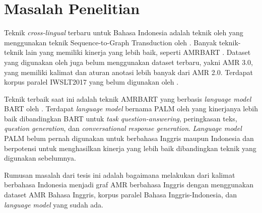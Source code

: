 \section{Masalah Penelitian}

Teknik \textit{cross-lingual} \amrparsing{} terbaru untuk Bahasa Indonesia adalah teknik oleh \textcite{putra2022} yang menggunakan teknik Sequence-to-Graph Transduction oleh .
Banyak teknik-teknik lain yang memiliki kinerja \amrparsing{} yang lebih baik, seperti AMRBART .
Dataset yang digunakan oleh \textcite{putra2022} juga belum menggunakan dataset terbaru, yakni AMR 3.0, yang memiliki kalimat dan aturan anotasi lebih banyak dari AMR 2.0.
Terdapat korpus paralel IWSLT2017  yang belum digunakan oleh \textcite{putra2022}.

Teknik \amrparsing{} terbaik saat ini adalah teknik AMRBART yang berbasis \textit{language model} BART oleh \textcite{lewis2020}.
Terdapat \textit{language model} bernama PALM oleh \textcite{bi2020} yang kinerjanya lebih baik dibandingkan BART untuk \textit{task} \textit{question-answering}, peringkasan teks, \textit{question generation}, dan \textit{conversational response generation}.
\textit{Language model} PALM belum pernah digunakan untuk \amrparsing{} berbahasa Inggris maupun Indonesia dan berpotensi untuk menghasilkan kinerja yang lebih baik dibandingkan teknik yang digunakan sebelumnya.

Rumusan masalah dari tesis ini adalah bagaimana melakukan \amrparsing{} dari kalimat berbahasa Indonesia menjadi graf \gls{AMR} berbahasa Inggris dengan menggunakan dataset \gls{AMR} Bahasa Inggris, korpus paralel Bahasa Inggris-Indonesia, dan \multil{} \textit{language model} yang sudah ada.
